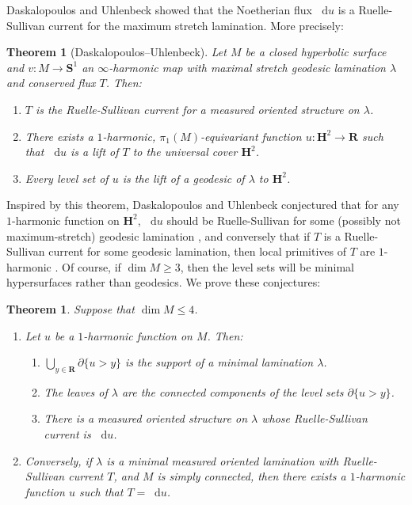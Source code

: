 \documentclass[reqno,11pt]{amsart}
\newcommand{\RR}{\mathbf{R}}
\newcommand{\Hyp}{\mathbf H}
\newcommand{\Sph}{\mathbf S}
\newcommand*\dif{\mathop{}\!\mathrm{d}}
\newtheorem{theorem}{Theorem}[section]
\newtheorem{mainthm}{Theorem}
\theoremstyle{definition}
\numberwithin{equation}{section}
\begin{document}
Daskalopoulos and Uhlenbeck \cite{daskalopoulos2020transverse,daskalopoulosPrep1} showed that the Noetherian flux $\dif u$ is a Ruelle-Sullivan current for the maximum stretch lamination. More precisely:

\begin{theorem}[Daskalopoulos--Uhlenbeck]\label{DU theorem}
Let $M$ be a closed hyperbolic surface and $v: M \to \Sph^1$ an $\infty$-harmonic map with maximal stretch geodesic lamination $\lambda$ and conserved flux $T$. Then:
\begin{enumerate}
\item $T$ is the Ruelle-Sullivan current for a measured oriented structure on $\lambda$.
\item There exists a $1$-harmonic, $\pi_1(M)$-equivariant function $u: \Hyp^2 \to \RR$ such that $\dif u$ is a lift of $T$ to the universal cover $\Hyp^2$.
\item Every level set of $u$ is the lift of a geodesic of $\lambda$ to $\Hyp^2$.
\end{enumerate}
\end{theorem}

Inspired by this theorem, Daskalopoulos and Uhlenbeck conjectured that for any $1$-harmonic function on $\Hyp^2$, $\dif u$ should be Ruelle-Sullivan for some (possibly not maximum-stretch) geodesic lamination \cite[Problem 9.4]{daskalopoulos2020transverse}, and conversely that if $T$ is a Ruelle-Sullivan current for some geodesic lamination, then local primitives of $T$ are $1$-harmonic \cite[Conjecture 9.5]{daskalopoulos2020transverse}.
Of course, if $\dim M \geq 3$, then the level sets will be minimal hypersurfaces rather than geodesics.
We prove these conjectures:

\begin{mainthm}\label{main thm}
Suppose that $\dim M \leq 4$.
\begin{enumerate}
\item Let $u$ be a $1$-harmonic function on $M$.
Then:
\begin{enumerate}
\item $\bigcup_{y \in \RR} \partial \{u > y\}$ is the support of a minimal lamination $\lambda$.
\item The leaves of $\lambda$ are the connected components of the level sets $\partial \{u > y\}$.
\item There is a measured oriented structure on $\lambda$ whose Ruelle-Sullivan current is $\dif u$.
\end{enumerate}
\item Conversely, if $\lambda$ is a minimal measured oriented lamination with Ruelle-Sullivan current $T$, and $M$ is simply connected, then there exists a $1$-harmonic function $u$ such that $T = \dif u$.
\end{enumerate}
\end{mainthm}
\end{document}
